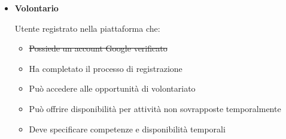 \begin{itemize}
\item \textbf{Volontario}

Utente registrato nella piattaforma che:
\begin{itemize}
    \item \sout{Possiede un account Google verificato}
    \item Ha completato il processo di registrazione
    \item Può accedere alle opportunità di volontariato
    \item Può offrire disponibilità per attività non sovrapposte temporalmente
    \item Deve specificare competenze e disponibilità temporali
\end{itemize}
\end{itemize}